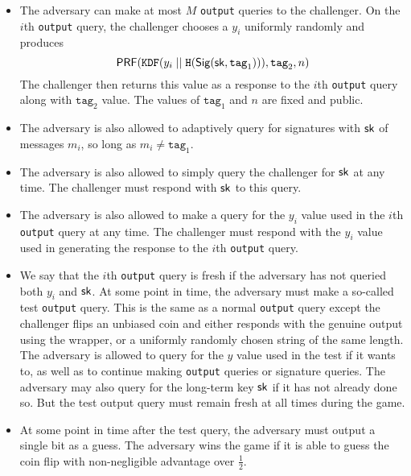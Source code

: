 \documentclass[12pt]{article}
\newcommand{\myconcat}{ \;||\; }
\begin{document}
\begin{itemize}

\item The adversary can make at most $M$ \texttt{output} queries to the challenger. On the $i$th \texttt{output} query, the challenger chooses a $y_i$ uniformly randomly and produces $$
\prf(\texttt{KDF}(y_i \myconcat \texttt{H}(\sig (\sk, \mathrm{\texttt{tag}_1}))), \texttt{tag}_2, n )
$$
\noindent The challenger then returns this value as a response to the $i$th \texttt{output} query along with $\texttt{tag}_2$ value. The values of $\texttt{tag}_1$ and $n$ are fixed and public. 

\item The adversary is also allowed to adaptively query for signatures with $\mathsf{sk}$ of messages $m_i$, so long as $m_i \neq \texttt{tag}_1$.

\item The adversary is also allowed to simply query the challenger for $\mathsf{sk}$ at any time. The challenger must respond with $\mathsf{sk}$ to this query.

\item The adversary is also allowed to make a query for the $y_i$ value used in the $i$th \texttt{output} query at any time. The challenger must respond with the $y_i$ value used in generating the response to the $i$th \texttt{output} query.

\item We say that the $i$th \texttt{output} query is fresh if the adversary has not queried both $y_i$ and $\mathsf{sk}$. At some point in time, the adversary must make a so-called test \texttt{output} query. This is the same as a normal \texttt{output} query except the challenger flips an unbiased coin and either responds with the genuine output using the wrapper, or a uniformly randomly chosen string of the same length. The adversary is allowed to query for the $y$ value used in the test if it wants to, as well as to continue making \texttt{output} queries or signature queries. The adversary may also query for the long-term key $\mathsf{sk}$ if it has not already done so. But the test output query must remain fresh at all times during the game.

\item At some point in time after the test query, the adversary must output a single bit as a guess. The adversary wins the game if it is able to guess the coin flip with non-negligible advantage over $\frac{1}{2}$.
\end{itemize}
\end{document}
